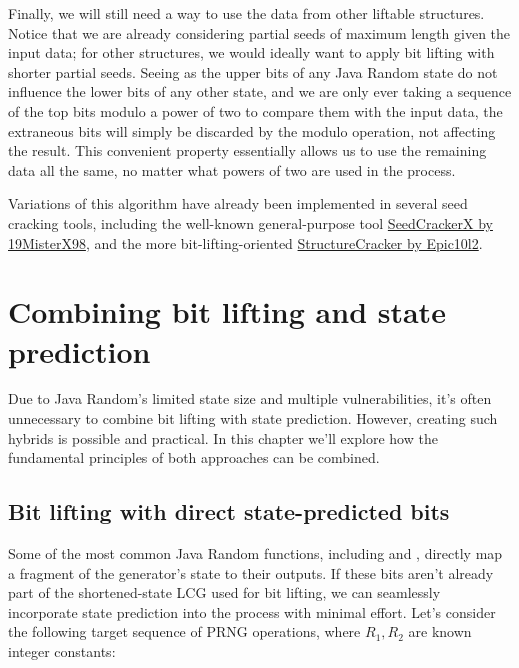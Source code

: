 \documentclass{article}
\begin{document}
Finally, we will still need a way to use the data from other liftable structures. Notice that we are already considering partial seeds of maximum length given the input data; for other structures, we would ideally want to apply bit lifting with shorter partial seeds. Seeing as the upper bits of any Java Random state do not influence the lower bits of any other state, and we are only ever taking a sequence of the top bits modulo a power of two to compare them with the input data, the extraneous bits will simply be discarded by the modulo operation, not affecting the result. This convenient property essentially allows us to use the remaining data all the same, no matter what powers of two are used in the process.

Variations of this algorithm have already been implemented in several seed cracking tools, including the well-known general-purpose tool \href{https://github.com/19MisterX98/SeedcrackerX}{SeedCrackerX by 19MisterX98}, and the more bit-lifting-oriented \href{https://github.com/Epic10l2/Structurecracker}{StructureCracker by Epic10l2}. %

\section{Combining bit lifting and state prediction}

Due to Java Random's limited state size and multiple vulnerabilities, it's often unnecessary to combine bit lifting with state prediction. However, creating such hybrids is possible and practical. In this chapter we'll explore how the fundamental principles of both approaches can be combined.

\subsection{Bit lifting with direct state-predicted bits}

Some of the most common Java Random functions, including  and , directly map a fragment of the generator's state to their outputs. If these bits aren't already part of the shortened-state LCG used for bit lifting, we can seamlessly incorporate state prediction into the process with minimal effort. Let's consider the following target sequence of PRNG operations, where $R_1, R_2$ are known integer constants:
\end{document}
